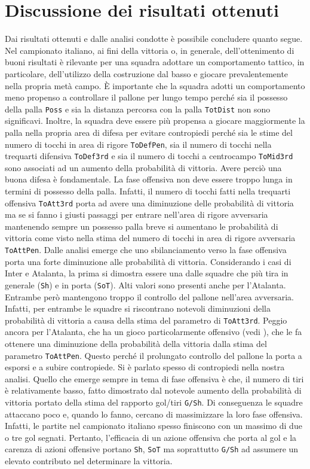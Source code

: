 \section{Discussione dei risultati ottenuti}
Dai risultati ottenuti e dalle analisi condotte è possibile concludere quanto segue. Nel campionato italiano, ai fini della vittoria o, in generale, dell'ottenimento di buoni risultati è rilevante per una squadra adottare un comportamento tattico, in particolare, dell'utilizzo della costruzione dal basso e giocare prevalentemente nella propria metà campo. 
È importante che la squadra adotti un comportamento meno propenso a controllare il pallone per lungo tempo perché sia il possesso della palla \texttt{Poss} e sia la distanza percorsa con la palla \texttt{TotDist} non sono significavi. Inoltre, la squadra deve essere più propensa a giocare maggiormente la palla nella propria area di difesa per evitare contropiedi perché sia le stime del numero di tocchi in area di rigore \texttt{ToDefPen}, sia il numero di tocchi nella trequarti difensiva \texttt{ToDef3rd} e sia il numero di tocchi a centrocampo \texttt{ToMid3rd} sono associati ad un aumento della probabilità di vittoria. Avere perciò una buona difesa è fondamentale. La fase offensiva non deve essere troppo lunga in termini di possesso della palla. Infatti, il numero di tocchi fatti nella trequarti offensiva \texttt{ToAtt3rd} porta ad avere una diminuzione delle probabilità di vittoria ma se si fanno i giusti passaggi per entrare nell'area di rigore avversaria mantenendo sempre un possesso palla breve si aumentano le probabilità di vittoria come visto nella stima del numero di tocchi in area di rigore avversaria \texttt{ToAttPen}. Dalle analisi emerge che uno sbilanciamento verso la fase offensiva porta una forte diminuzione alle probabilità di vittoria. Considerando i casi di Inter e Atalanta, la prima si dimostra essere una dalle squadre che più tira in generale (\texttt{Sh}) e in porta (\texttt{SoT}). Alti valori sono presenti anche per l'Atalanta. Entrambe però mantengono troppo il controllo del pallone nell'area avversaria. Infatti, per entrambe le squadre si riscontrano notevoli diminuzioni della probabilità di vittoria a causa della stima del parametro di \texttt{ToAtt3rd}. Peggio ancora per l'Atalanta, che ha un gioco particolarmente offensivo (vedi \textit{\cite{ataGioco}}), che le fa ottenere una diminuzione della probabilità della vittoria dalla stima del parametro \texttt{ToAttPen}. Questo perché il prolungato controllo del pallone la porta a esporsi e a subire contropiede. Si è parlato spesso di contropiedi nella nostra analisi. Quello che emerge sempre in tema di fase offensiva è che, il numero di tiri è relativamente basso, fatto dimostrato dal notevole aumento della probabilità di vittoria portato della stima del rapporto gol/tiri \texttt{G/Sh}. Di conseguenza le squadre attaccano poco e, quando lo fanno, cercano di massimizzare la loro fase offensiva. Infatti, le partite nel campionato italiano spesso finiscono con un massimo di due o tre gol segnati. Pertanto, l'efficacia di un azione offensiva che porta al gol e la carenza di azioni offensive portano \texttt{Sh}, \texttt{SoT} ma soprattutto \texttt{G/Sh} ad assumere un elevato contributo nel determinare la vittoria.\\
